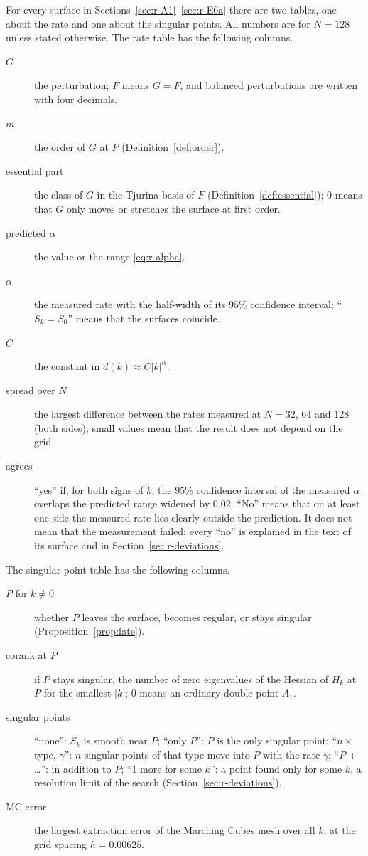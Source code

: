 \documentclass[12pt, a4paper, oneside]{book}
\theoremstyle{plain}
\theoremstyle{definition}
\theoremstyle{remark}
\theoremstyle{definition}
\begin{document}
For every surface in Sections~\ref{sec:r-A1}--\ref{sec:r-E6a} there are two tables, one about the rate and one about the singular points. All numbers are for $N=128$ unless stated otherwise. The rate table has the following columns.
\begin{description}
    \item[$G$] the perturbation; $F$ means $G=F$, and balanced perturbations are written with four decimals.
    \item[$m$] the order of $G$ at $P$ (Definition~\ref{def:order}).
    \item[essential part] the class of $G$ in the Tjurina basis of $F$ (Definition~\ref{def:essential}); $0$ means that $G$ only moves or stretches the surface at first order.
    \item[predicted $\alpha$] the value or the range \eqref{eq:r-alpha}.
    \item[$\alpha$] the measured rate with the half-width of its $95\%$ confidence interval; ``$S_k=S_0$'' means that the surfaces coincide.
    \item[$C$] the constant in $d(k)\approx C|k|^\alpha$.
    \item[spread over $N$] the largest difference between the rates measured at $N=32$, $64$ and $128$ (both sides); small values mean that the result does not depend on the grid.
    \item[agrees] ``yes'' if, for both signs of $k$, the $95\%$ confidence interval of the measured $\alpha$ overlaps the predicted range widened by $0.02$. ``No'' means that on at least one side the measured rate lies clearly outside the prediction. It does not mean that the measurement failed: every ``no'' is explained in the text of its surface and in Section~\ref{sec:r-deviations}.
\end{description}
The singular-point table has the following columns.
\begin{description}
    \item[$P$ for $k\neq0$] whether $P$ leaves the surface, becomes regular, or stays singular (Proposition~\ref{prop:fate}).
    \item[corank at $P$] if $P$ stays singular, the number of zero eigenvalues of the Hessian of $H_k$ at $P$ for the smallest $|k|$; $0$ means an ordinary double point $A_1$.
    \item[singular points] ``none'': $S_k$ is smooth near $P$; ``only $P$'': $P$ is the only singular point; ``$n\times$type, $\gamma$'': $n$ singular points of that type move into $P$ with the rate $\gamma$; ``$P$ + \dots'': in addition to $P$; ``1 more for some $k$'': a point found only for some $k$, a resolution limit of the search (Section~\ref{sec:r-deviations}).
    \item[MC error] the largest extraction error of the Marching Cubes mesh over all $k$, at the grid spacing $h=0.00625$.
\end{description}
\end{document}

